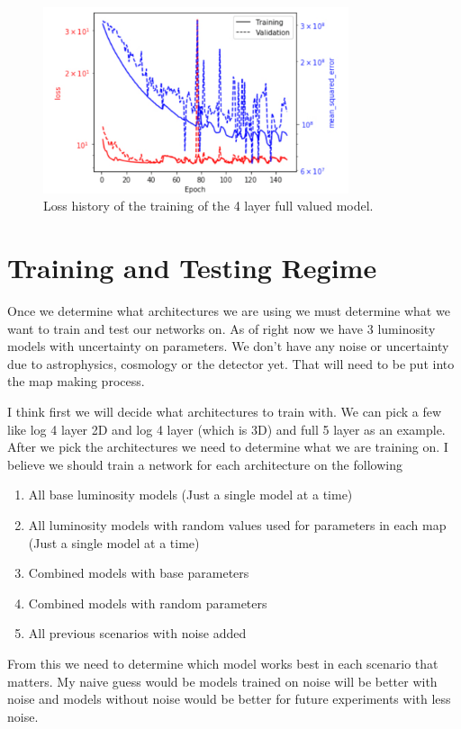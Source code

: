 \documentclass{article}
\begin{document}
			\begin{figure}[H]
				\centering
				\includegraphics[width=0.8\textwidth]{full_lum_4_layer_model_history.pdf}
				\caption{Loss history of the training of the 4 layer full valued model.}
				\label{fig:full_lum_4_layer_model_history}
			\end{figure}

	\section{Training and Testing Regime} \label{sec:tat}
		Once we determine what architectures we are using we must determine what we want to train and test our networks on.  As of right now we have 3 luminosity models with uncertainty on parameters.  We don't have any noise or uncertainty due to astrophysics, cosmology or the detector yet.  That will need to be put into the map making process.

		I think first we will decide what architectures to train with.  We can pick a few like log 4 layer 2D and log 4 layer (which is 3D) and full 5 layer as an example.  After we pick the architectures we need to determine what we are training on.  I believe we should train a network for each architecture on the following
		\begin{enumerate}
			\item All base luminosity models (Just a single model at a time)

			\item All luminosity models with random values used for parameters in each map (Just a single model at a time)

			\item Combined models with base parameters

			\item Combined models with random parameters

			\item All previous scenarios with noise added
		\end{enumerate}
		From this we need to determine which model works best in each scenario that matters.  My naive guess would be models trained on noise will be better with noise and models without noise would be better for future experiments with less noise.
\end{document}

